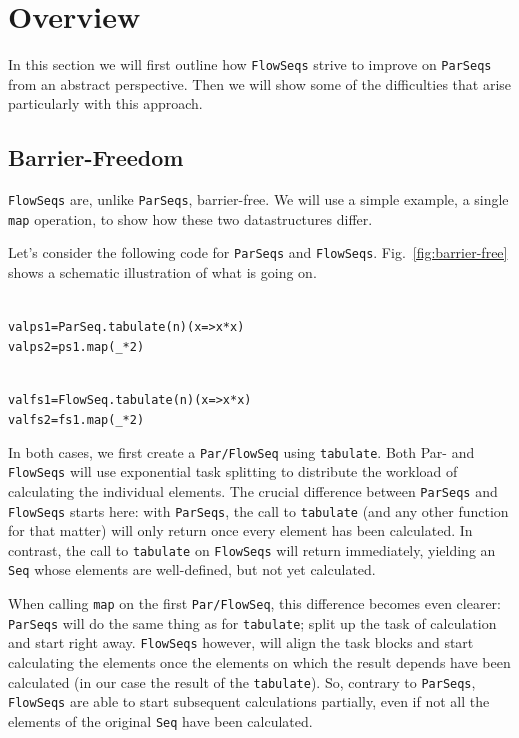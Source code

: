 \documentclass[runningheads,a4paper,fleqn]{llncs}
\begin{document}
\section{Overview}
\label{sec:overview}

In this section we will first outline how \texttt{FlowSeqs} strive to improve
on \texttt{ParSeqs} from an abstract perspective. Then we will show some of
the difficulties that arise particularly with this approach.

\subsection{Barrier-Freedom}
\texttt{FlowSeqs} are, unlike \texttt{ParSeqs}, barrier-free. We will use a simple
example, a single \texttt{map} operation, to show how these two
datastructures differ.

Let's consider the following code for \texttt{ParSeqs} and
\texttt{FlowSeqs}. Fig.~\ref{fig:barrier-free} shows a schematic
illustration of what is going on.

\noindent
\begin{minipage}[t]{.49\textwidth}
\begin{alltt}
{\scriptsize
val ps1 = ParSeq.tabulate(n)(x => x*x)
val ps2 = ps1.map(_ * 2)
}
\end{alltt}
\end{minipage}
\begin{minipage}[t]{.49\textwidth}
\begin{alltt}
{\scriptsize
val fs1 = FlowSeq.tabulate(n)(x => x*x)
val fs2 = fs1.map(_ * 2)
}
\end{alltt}
\end{minipage}

In both cases, we first create a \texttt{Par/FlowSeq} using
\texttt{tabulate}. Both Par- and \texttt{FlowSeqs} will use exponential task
splitting \cite{collect11,cong08} to distribute the workload of
calculating the individual elements. The crucial difference between
\texttt{ParSeqs} and \texttt{FlowSeqs} starts here: with \texttt{ParSeqs}, the call to
\texttt{tabulate} (and any other function for that matter) will only
return once every element has been calculated. In contrast, the call
to \texttt{tabulate} on \texttt{FlowSeqs} will return immediately, yielding
an \texttt{Seq} whose elements are well-defined, but not yet calculated.

When calling \texttt{map} on the first \texttt{Par/FlowSeq}, this difference
becomes even clearer: \texttt{ParSeqs} will do the same thing as for
\texttt{tabulate}; split up the task of calculation and start right
away. \texttt{FlowSeqs} however, will align the task blocks and start
calculating the elements once the elements on which the result depends have
been calculated (in our case the result of the \texttt{tabulate}). So,
contrary to \texttt{ParSeqs}, \texttt{FlowSeqs} are able to start subsequent
calculations partially, even if not all the elements of the original
\texttt{Seq} have been calculated.
\end{document}
